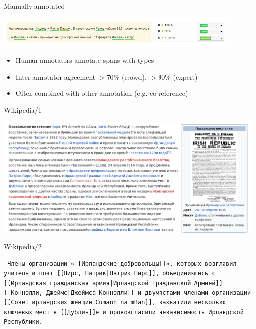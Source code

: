\documentclass[10pt, compress]{beamer}
\begin{document}
\begin{frame}{Manually annotated}

\begin{center}
  \includegraphics[width=0.9\textwidth]{graphics/factru-anno.png}
\end{center}

\begin{itemize}
  \item Human annotators annotate spans with types
  \item Inter-annotator agreement $>70\%$ (crowd), $>90\%$ (expert)
  \item Often combined with other annotation (e.g. co-reference) 
\end{itemize}

\end{frame}

\begin{frame}{Wikipedia/1}

\includegraphics[width=\textwidth]{graphics/wikipedia-1.png}

\end{frame}

\begin{frame}{Wikipedia/2}

{\tt
Члены организации «[[Ирландские добровольцы]]», которых возглавил учитель 
и поэт [[Пирс, Патрик|Патрик Пирс]], объединившись с [[Ирландская гражданская армия|Ирландской Гражданской Армией]] [[Коннолли, Джеймс|Джеймса Коннолли]] и двумястами членами организации [[Совет ирландских женщин|Cumann na mBan]], захватили несколько ключевых мест в \alert<2>{[[Дублин]]е} и провозгласили независимость Ирландской Республики. 
}
\end{frame}
\end{document}
